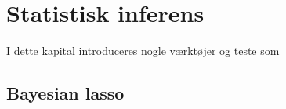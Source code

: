 \chapter{Statistisk inferens} \label{kap:statistisk_inferens}
I dette kapital introduceres nogle værktøjer og teste som 

\section{Bayesian lasso}

